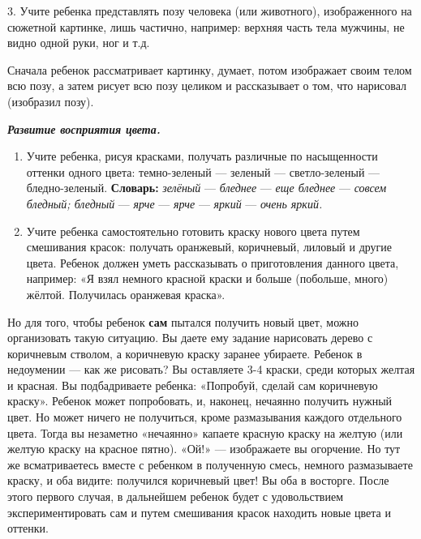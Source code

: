 \documentclass{book}
\renewcommand{\emph}[1]{\textit{#1}}
\begin{document}
3. Учите ребенка представлять позу человека (или животного),
изображенного на сюжетной картинке, лишь частично, например: верхняя
часть тела мужчины, не видно одной руки, ног и т.д.

Сначала ребенок рассматривает картинку, думает, потом изображает своим
телом всю позу, а затем рисует всю позу целиком и рассказывает о том,
что нарисовал (изобразил позу).

\emph{\textbf{Развитие восприятия цвета.}}


\begin{enumerate}
\def\labelenumi{\arabic{enumi}.}
\item
  
  Учите ребенка, рисуя красками, получать различные по насыщенности
  оттенки одного цвета: темно-зеленый --- зеленый --- светло-зеленый ---
  бледно-зеленый. \textbf{Словарь:} \emph{зелёный} --- \emph{бледнее}
  --- \emph{еще бледнее} --- \emph{совсем бледный; бледный} ---
  \emph{ярче} --- \emph{ярче} --- \emph{яркий} --- \emph{очень яркий.}
  
\item
  
  Учите ребенка самостоятельно готовить краску нового цвета путем
  смешивания красок: получать оранжевый, коричневый, лиловый и другие
  цвета. Ребенок должен уметь рассказывать о приготовления данного
  цвета, например: «Я взял немного красной краски и больше (побольше,
  много) жёлтой. Получилась оранжевая краска».
  
\end{enumerate}


Но для того, чтобы ребенок \textbf{сам} пытался получить новый цвет,
можно организовать такую ситуацию. Вы даете ему задание нарисовать
дерево с коричневым стволом, а коричневую краску заранее убираете.
Ребенок в недоумении --- как же рисовать? Вы оставляете 3-4 краски,
среди которых желтая и красная. Вы подбадриваете ребенка: «Попробуй,
сделай сам коричневую краску». Ребенок может попробовать, и, наконец,
нечаянно получить нужный цвет. Но может ничего не получиться, кроме
размазывания каждого отдельного цвета. Тогда вы незаметно «нечаянно»
капаете красную краску на желтую (или желтую краску на красное пятно).
«Ой!» --- изображаете вы огорчение. Но тут же всматриваетесь вместе с
ребенком в полученную смесь, немного размазываете краску, и оба видите:
получился коричневый цвет! Вы оба в восторге. После этого первого
случая, в дальнейшем ребенок будет с удовольствием экспериментировать
сам и путем смешивания красок находить новые цвета и оттенки.
\end{document}
